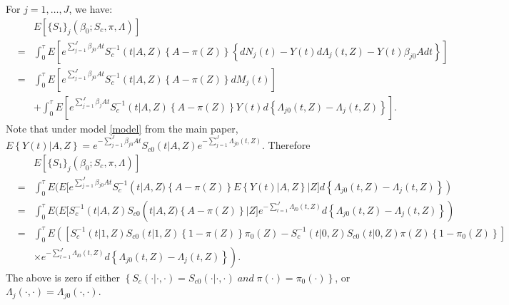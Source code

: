 \documentclass[11pt]{article}
\newcommand{\eqnn}{\begin{eqnarray*}}
\newcommand{\een}{\end{eqnarray*}}
\begin{document}
For $j=1,\ldots,J$, we have:
\eqnn
&&E\left[\{{S}_{1}\}_j(\beta_0;S_c, \pi, \Lambda)\right]\\
&=&\int_0^\tau E \left[ e^{\sum_{j=1}^J \beta_{j0} At} S_c^{-1}(t | A,Z)\left\{A - \pi(Z)\right\}\left\{dN_{j}(t)-Y(t)d \Lambda_{j}(t,Z )-Y(t)\beta_{j0}Adt\right\}\right]\\
&=&\int_0^\tau  E [e^{\sum_{j=1}^J \beta_{j0} A t} S_c^{-1}(t | A,Z)\left\{A - \pi(Z)\right\}dM_{j}(t)]
\\
&& +\int_0^\tau  E [e^{\sum_{j=1}^J \beta_j A t} S_c^{-1}(t | A,Z)\left\{A - \pi(Z)\right\}Y(t)d\left\{\Lambda_{j0}(t,Z)- \Lambda_{j}(t,Z)\right\}].
\een
Note that under model \eqref{model} from the main paper, ${E}\left\{Y(t)| A, Z\right\}=e^{-\sum_{j=1}^J \beta_{j0} A t}S_{c0}(t | A,Z)e^{-\sum_{j=1}^J \Lambda_{j0}(t,Z)}$.
Therefore 
\eqnn
&&E\left[\{{S}_{1}\}_j(\beta_0; S_c, \pi, \Lambda)\right]\\
&=&\int_0^\tau  E( E [e^{\sum_{j=1}^J \beta_{j0} A t} S_c^{-1}(t | A,Z)\left\{A - \pi(Z)\right\} E \left\{Y(t)| A,Z\right\}| Z]d\left\{\Lambda_{j0}(t,Z)- \Lambda_{j}(t,Z)\right\})\\
&=&\int_0^\tau  E( E [ S_c^{-1}(t | A,Z)S_{c0}(t | A,Z)\left\{A - \pi(Z)\right\}| Z]e^{-\sum_{l=1}^J\Lambda_{l0}(t,Z)}d\left\{\Lambda_{j0}(t,Z)- \Lambda_{j}(t,Z)\right\})\\
&=&\int_0^\tau  E\left(\left[ S_c^{-1}(t | 1,Z)S_{c0}(t | 1,Z)\left\{1 - \pi(Z)\right\}\pi_0(Z)- S_c^{-1}(t | 0,Z)S_{c0}(t | 0,Z)\pi(Z)\left\{1-\pi_0(Z)\right\}\right]\right.\nonumber
\\
&&\times \left.e^{-\sum_{l=1}^J\Lambda_{l0}(t,Z)}d\left\{\Lambda_{j0}(t,Z)- \Lambda_{j}(t,Z)\right\}\right).
\een
The above is zero if either 
$\left\{S_c\left(\cdot | \cdot,\cdot \right)= S_{c0}(\cdot| \cdot,\cdot)\;and\;\pi(\cdot)= \pi_0(\cdot)\right\}$, or
$\Lambda_{j}(\cdot,\cdot)=\Lambda_{j0}(\cdot,\cdot )$.
\end{document}
